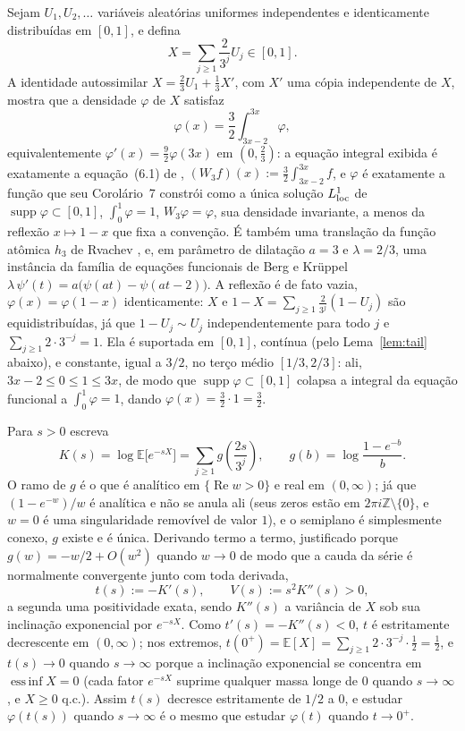 \documentclass[11pt]{amsart}
\theoremstyle{plain}
\theoremstyle{definition}
\theoremstyle{remark}
\newcommand{\Z}{\mathbb{Z}}
\begin{document}
Sejam $U_1, U_2, \dots$ variáveis aleatórias uniformes independentes e identicamente distribuídas
em $[0,1]$, e defina
\[
X = \sum_{j \ge 1} \frac{2}{3^j} U_j \in [0,1].
\]
A identidade autossimilar $X = \tfrac{2}{3}U_1 + \tfrac{1}{3}X'$, com $X'$ uma cópia independente de
$X$, mostra que a densidade $\varphi$ de $X$ satisfaz
\[
\varphi(x) = \frac{3}{2}\int_{3x-2}^{3x} \varphi,
\]
equivalentemente $\varphi'(x) = \tfrac{9}{2}\varphi(3x)$ em $(0, \tfrac{2}{3})$: a equação integral
exibida é exatamente a equação~(6.1) de \cite{wirsching2003}, $(W_3f)(x) := \tfrac32\int_{3x-2}^{3x}
f$, e $\varphi$ é exatamente a função que seu Corolário~7 constrói como a única solução
$L^1_{\rm loc}$ de $\operatorname{supp}\varphi\subset[0,1]$, $\int_0^1\varphi=1$, $W_3\varphi=\varphi$,
sua densidade invariante, a menos da reflexão $x \mapsto 1-x$ que fixa a convenção. É também uma
translação da função atômica $h_3$ de Rvachev \cite{rvachev1990}, e, em parâmetro de dilatação
$a=3$ e $\lambda=2/3$, uma instância da família de equações funcionais de Berg e Kr\"uppel
$\lambda\, \psi'(t) = a\bigl(\psi(at) - \psi(at-2)\bigr)$. A reflexão é de fato vazia,
$\varphi(x)=\varphi(1-x)$ identicamente: $X$ e $1-X=\sum_{j\ge1}\tfrac{2}{3^j}(1-U_j)$ são
equidistribuídas, já que $1-U_j\sim U_j$ independentemente para todo $j$ e
$\sum_{j\ge1}2\cdot3^{-j}=1$. Ela é suportada em $[0,1]$, contínua (pelo Lema~\ref{lem:tail}
abaixo), e constante, igual a $3/2$, no terço médio $[1/3, 2/3]$: ali, $3x-2\le0\le1\le3x$, de modo
que $\operatorname{supp}\varphi\subset[0,1]$ colapsa a integral da equação funcional a
$\int_0^1\varphi=1$, dando $\varphi(x)=\tfrac32\cdot1=\tfrac32$.

Para $s > 0$ escreva
\[
K(s) = \log \mathbb{E}\bigl[e^{-sX}\bigr] = \sum_{j \ge 1} g\!\left(\frac{2s}{3^j}\right), \qquad
g(b) = \log\frac{1-e^{-b}}{b}.
\]
O ramo de $g$ é o que é analítico em $\{\operatorname{Re} w > 0\}$ e real em $(0,\infty)$; já que
$(1-e^{-w})/w$ é analítica e não se anula ali (seus zeros estão em $2\pi i \Z \setminus \{0\}$, e
$w=0$ é uma singularidade removível de valor $1$), e o semiplano é simplesmente conexo, $g$ existe e
é única. Derivando termo a termo, justificado porque $g(w) = -w/2 + O(w^2)$ quando $w \to 0$ de modo
que a cauda da série é normalmente convergente junto com toda derivada,
\[
t(s) := -K'(s), \qquad V(s) := s^2 K''(s) > 0,
\]
a segunda uma positividade exata, sendo $K''(s)$ a variância de $X$ sob sua inclinação exponencial
por $e^{-sX}$. Como $t'(s) = -K''(s) < 0$, $t$ é estritamente decrescente em $(0,\infty)$; nos
extremos, $t(0^+) = \mathbb E[X] = \sum_{j\ge1} 2\cdot3^{-j}\cdot\tfrac12 = \tfrac12$, e $t(s)\to0$
quando $s\to\infty$ porque a inclinação exponencial se concentra em $\operatorname{ess\,inf} X=0$
(cada fator $e^{-sX}$ suprime qualquer massa longe de $0$ quando $s\to\infty$, e $X\ge0$ q.c.).
Assim $t(s)$ decresce estritamente de $1/2$ a $0$, e estudar $\varphi(t(s))$ quando $s \to \infty$ é
o mesmo que estudar $\varphi(t)$ quando $t \to 0^+$.
\end{document}
